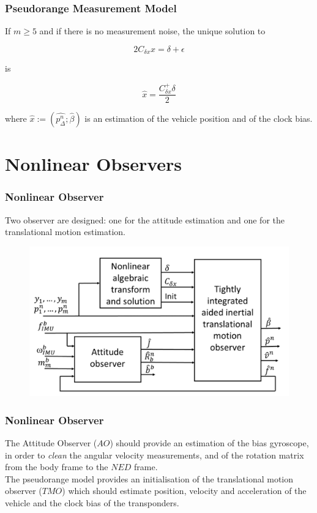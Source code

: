 \documentclass{beamer}
\begin{document}
	\begin{frame}
		\frametitle{Pseudorange Measurement Model}
		If $m \geqslant 5$ and if there is no measurement noise, the unique solution to 
		
		\[ 2C_{\delta x} x = \delta + \epsilon \]
		
		is
		
		\[\hat{x} = \frac {C_{\delta x}^{+} \delta}{2}  \]
		
		where $\hat{x} := (\hat{p^n_\Delta};\hat{\beta})$ is an estimation of the vehicle position and of the clock bias.
\end{frame}
\section{Nonlinear Observers}
	\begin{frame}
	\frametitle{Nonlinear Observer}
	Two observer are designed: one for the attitude estimation and one for the translational motion estimation. 
		\begin{figure}[H]
		\centering
		\includegraphics[scale=0.3]{observers}
	\end{figure}
	\end{frame}

	\begin{frame}
		\frametitle{Nonlinear Observer}
		The Attitude Observer ($AO$) should provide an estimation of the bias gyroscope, in order to \textit{clean} the angular velocity measurements, and of the rotation matrix from the body frame to the $NED$ frame.\\
		\vspace{0.3cm}
		The pseudorange model provides an initialisation of the translational motion observer ($TMO$) which should estimate position, velocity and acceleration of the vehicle and the clock bias of the transponders.
	\end{frame}
\end{document}
